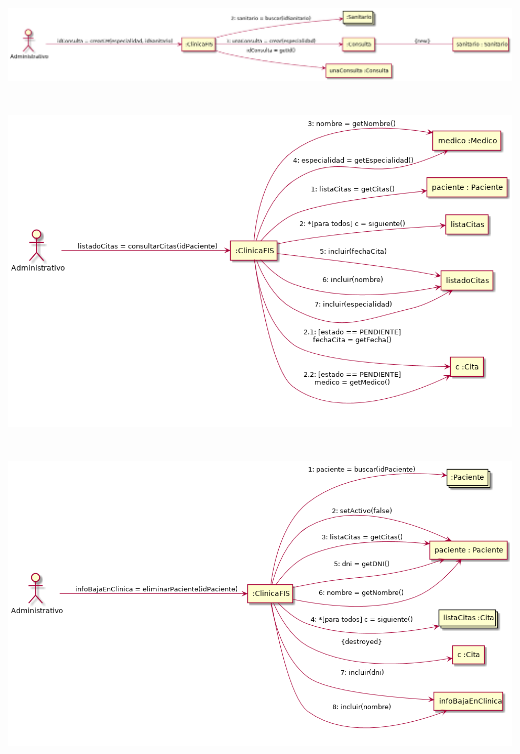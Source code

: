 \documentclass[10pt,a4paper,spanish]{report}
\begin{document}
\subsection*{}
\begin{center}
	\includegraphics[scale=0.3]{crearCM.png}
\end{center}
\subsection*{}
\begin{center}
	\includegraphics[scale=0.4]{consultarCitas.png}
\end{center}
\subsection*{}
\begin{center}
	\includegraphics[scale=0.35]{eliminarPaciente.png}
\end{center}
\end{document}
